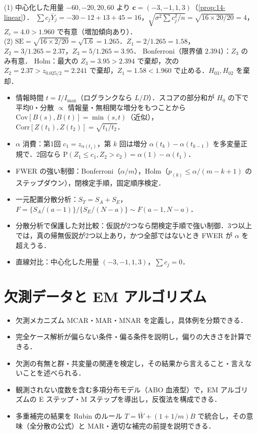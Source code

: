 \documentclass[a4paper,11pt,openany]{ltjsbook}
\newenvironment{kaitou}[1]{%
  \par\medskip\noindent
  \begin{tcolorbox}[enhanced,breakable,colback=bkgray!3,colframe=bkgray!60,boxrule=0.4pt,
    left=4pt,right=4pt,top=2pt,bottom=2pt,arc=1pt,
    title={\cref{#1}の解答},fonttitle=\bfseries\small,coltitle=white,colbacktitle=bkgray!80]}%
  {\end{tcolorbox}\par}
\newcommand{\Cov}{\mathrm{Cov}}
\newcommand{\Corr}{\mathrm{Corr}}
\newcommand{\Prob}{\mathrm{P}}
\newcommand{\SE}{\mathrm{SE}}
\begin{document}
\begin{kaitou}{reidai:14-3}
(1) 中心化した用量 $-60,-20,20,60$ より $\bm c=(-3,-1,1,3)$（\cref{prop:14-linear}）．
$\sum c_j\bar Y_j=-30-12+13+45=16$，$\sqrt{\sigma^2\sum c_j^2/n}=\sqrt{16\times20/20}=4$，$Z_c=4.0>1.960$ で有意（増加傾向あり）．\\
(2) $\SE=\sqrt{16\times2/20}=\sqrt{1.6}=1.265$．$Z_1=2/1.265=1.58$，$Z_2=3/1.265=2.37$，$Z_3=5/1.265=3.95$．
Bonferroni（限界値 $2.394$）：$Z_3$ のみ有意．
Holm：最大の $Z_3=3.95>2.394$ で棄却，次の $Z_2=2.37>z_{0.025/2}=2.241$ で棄却，$Z_1=1.58<1.960$ で止める．$H_{03},H_{02}$ を棄却．
\end{kaitou}

\begin{summarybox}
\begin{itemize}
\item 情報時間 $t=I/I_{\max}$（ログランクなら $L/D$）．スコアの部分和が $H_0$ の下で平均0・分散 $\propto$ 情報量・無相関な増分をもつことから $\Cov[B(s),B(t)]=\min(s,t)$（近似），$\Corr[Z(t_1),Z(t_2)]=\sqrt{t_1/t_2}$．
\item $\alpha$ 消費：第1回 $c_1=z_{\alpha(t_1)}$，第 $k$ 回は増分 $\alpha(t_k)-\alpha(t_{k-1})$ を多変量正規で．2回なら $\Prob(Z_1\le c_1,Z_2>c_2)=\alpha(1)-\alpha(t_1)$．
\item FWER の強い制御：Bonferroni（$\alpha/m$），Holm（$p_{(k)}\le\alpha/(m-k+1)$ のステップダウン），閉検定手順，固定順序検定．
\item 一元配置分散分析：$S_T=S_A+S_E$，$F=\{S_A/(a-1)\}/\{S_E/(N-a)\}\sim F(a-1,N-a)$．
\item 分散分析で保護した対比較：仮説が2つなら閉検定手順で強い制御．3つ以上では，真の帰無仮説が2つ以上あり，かつ全部ではないとき FWER が $\alpha$ を超えうる．
\item 直線対比：中心化した用量 $(-3,-1,1,3)$，$\sum c_j=0$．
\end{itemize}
\end{summarybox}

\chapter{欠測データと EM アルゴリズム}\label{ch:16}

\begin{goalbox}
\begin{itemize}
\item 欠測メカニズム MCAR・MAR・MNAR を定義し，具体例を分類できる．
\item 完全ケース解析が偏らない条件・偏る条件を説明し，偏りの大きさを計算できる．
\item 欠測の有無と群・共変量の関連を検定し，その結果から言えること・言えないことを述べられる．
\item 観測されない度数を含む多項分布モデル（ABO 血液型）で，EM アルゴリズムの E ステップ・M ステップを導出し，反復法を構成できる．
\item 多重補完の結果を Rubin のルール $T=\bar W+(1+1/m)B$ で統合し，その意味（全分散の公式）と MAR・適切な補完の前提を説明できる．
\end{itemize}
\end{goalbox}
\end{document}
